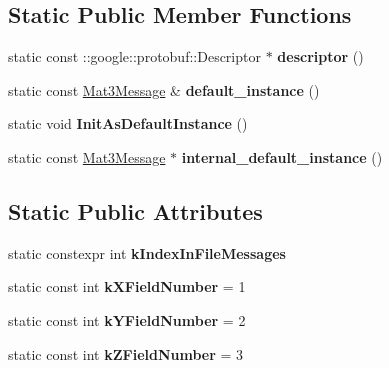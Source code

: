\subsection*{Static Public Member Functions}
\begin{DoxyCompactItemize}
\item 
\mbox{\label{classtbMath_1_1Mat3Message_a34b5840ade3969f7a4d0dd2d816f8f5d}} 
static const \+::google\+::protobuf\+::\+Descriptor $\ast$ {\bfseries descriptor} ()
\item 
\mbox{\label{classtbMath_1_1Mat3Message_a05d11b580eb6fac14f309c3b114b4555}} 
static const \hyperlink{classtbMath_1_1Mat3Message}{Mat3\+Message} \& {\bfseries default\+\_\+instance} ()
\item 
\mbox{\label{classtbMath_1_1Mat3Message_ac2a60fe1d1cddd3a73919bf49a3aff38}} 
static void {\bfseries Init\+As\+Default\+Instance} ()
\item 
\mbox{\label{classtbMath_1_1Mat3Message_a51a85cb7b1bfd1183536d0ed9a0a48aa}} 
static const \hyperlink{classtbMath_1_1Mat3Message}{Mat3\+Message} $\ast$ {\bfseries internal\+\_\+default\+\_\+instance} ()
\end{DoxyCompactItemize}
\subsection*{Static Public Attributes}
\begin{DoxyCompactItemize}
\item 
static constexpr int {\bfseries k\+Index\+In\+File\+Messages}
\item 
\mbox{\label{classtbMath_1_1Mat3Message_a96c0a0558c45029cd3943749f0aec095}} 
static const int {\bfseries k\+X\+Field\+Number} = 1
\item 
\mbox{\label{classtbMath_1_1Mat3Message_a8d26d83f5f931a6468581f023c46b355}} 
static const int {\bfseries k\+Y\+Field\+Number} = 2
\item 
\mbox{\label{classtbMath_1_1Mat3Message_aa2fbaeba80ec4804763109f604f915c5}} 
static const int {\bfseries k\+Z\+Field\+Number} = 3
\end{DoxyCompactItemize}
